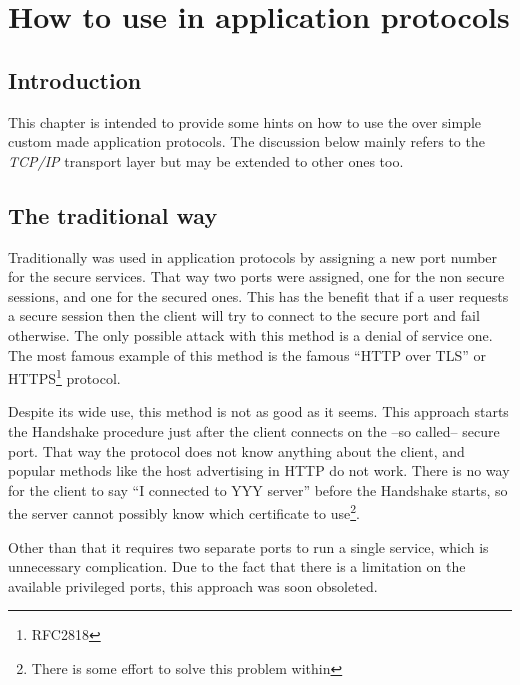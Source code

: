 \chapter{How to use \tls{} in application protocols}
\label{apps}

\section{Introduction}
This chapter is intended to provide some hints on how to use the \tls{}
over simple custom made application protocols. 
The discussion below mainly refers to the \emph{TCP/IP} transport layer
but may be extended to other ones too.

\section{The traditional way}

Traditionally \ssl{} was used in application protocols by assigning 
a new port number for the secure services. That way two ports were assigned, one for the
non secure sessions, and one for the secured ones. This has the benefit
that if a user requests a secure session then the client will try to
connect to the secure port and fail otherwise. The only possible attack
with this method is a denial of service one. The most famous
example of this method is the famous ``HTTP over TLS'' or HTTPS\footnote{RFC2818} 
protocol.
\par
Despite its wide use, this method is not as good as it seems.
This approach starts the \tls{} Handshake procedure just after the
client connects on the --so called-- secure port. 
That way the \tls{} protocol does not know anything
about the client, and popular methods like the host advertising in 
HTTP do not work. There is no way for the client to say ``I connected
to YYY server'' before the Handshake starts, so the server cannot
possibly know which certificate to use\footnote{There is some effort to solve
this problem within \tls{}}.

\par
Other than that it requires two separate ports to run a single service, which is 
unnecessary complication. Due to the fact that there is a limitation on 
the available privileged ports, this approach was soon obsoleted.


